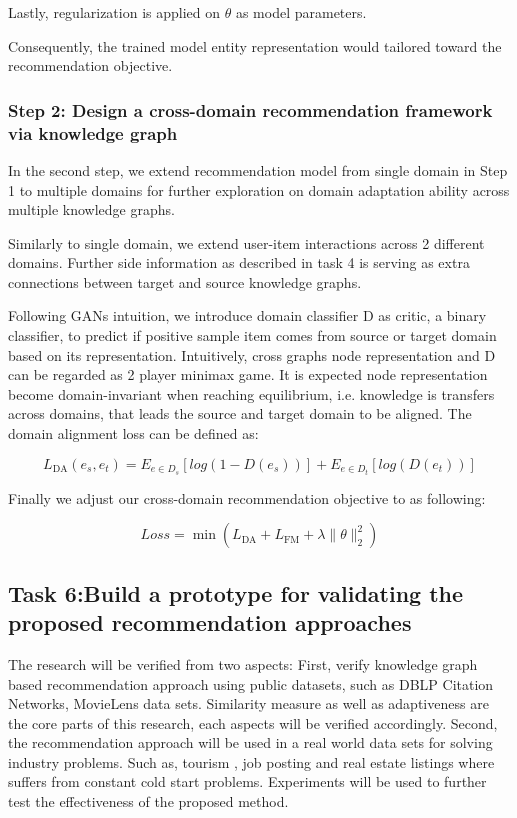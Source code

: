 Lastly, regularization is applied on $\theta$ as model parameters.

Consequently, the trained model entity representation would tailored toward the recommendation objective.


\subsubsection*{Step 2: Design a cross-domain recommendation framework via knowledge graph}

In the second step, we extend recommendation model from single domain in Step 1 to multiple domains for further exploration on domain adaptation ability across multiple knowledge graphs.

Similarly to single domain, we extend user-item interactions across 2 different domains. Further side information as described in task 4 is serving as extra connections between target and source knowledge graphs.

Following GANs intuition, we introduce domain classifier D as critic, a binary classifier, to predict if positive sample item comes from source or target domain based on its representation. Intuitively, cross graphs node representation and D can be regarded as 2 player minimax game. It is expected node representation become domain-invariant when reaching equilibrium, i.e. knowledge is transfers across domains, that leads the source and target domain to be aligned. The domain alignment loss can be defined as:

\begin{equation}
    L_\text{DA}(e_s,e_t)=E_{e \in D_s}[log(1-D(e_s))] + E_{e \in D_t}[log(D(e_t))]
\end{equation}

Finally we adjust our cross-domain recommendation objective to as following:

\begin{equation}
    Loss=\min{(L_\text{DA}+L_\text{FM}+\lambda\|\theta\|^2_2)}
\end{equation}

\subsection*{Task 6:Build a prototype for validating the proposed recommendation approaches}

The research will be verified from two aspects: 
First, verify knowledge graph based recommendation approach using public datasets, such as DBLP Citation Networks, MovieLens data sets. Similarity measure as well as adaptiveness are the core parts of this research, each aspects will be verified accordingly.
Second, the recommendation approach will be used in a real world data sets for solving industry problems. Such as, tourism , job posting and real estate listings where suffers from constant cold start problems. Experiments will be used to further test the effectiveness of the proposed method.

